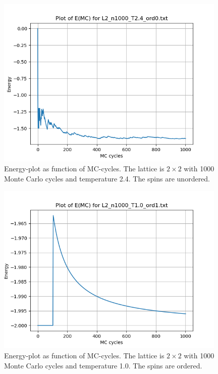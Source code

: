 \documentclass{article}
\begin{document}
  \begin{figure}[ht]
      \centering
      \includegraphics[width = 11cm]{img/energy_L2_n1000_T24_ord0.png}
      \caption{Energy-plot as function of MC-cycles. The lattice is $2 \times 2$ with 1000 Monte Carlo cycles and temperature 2.4. The spins are unordered. }
      \label{fig:energy_L2_n1000_T2.4_ord0}
    \end{figure}

  \begin{figure}[ht]
      \centering
      \includegraphics[width = 11cm]{img/energy_L2_n1000_T10_ord1.png}
      \caption{Energy-plot as function of MC-cycles. The lattice is $2 \times 2$ with 1000 Monte Carlo cycles and temperature 1.0. The spins are ordered. }
      \label{fig:energy_L2_n1000_T1.0_ord1}
    \end{figure}
\end{document}
